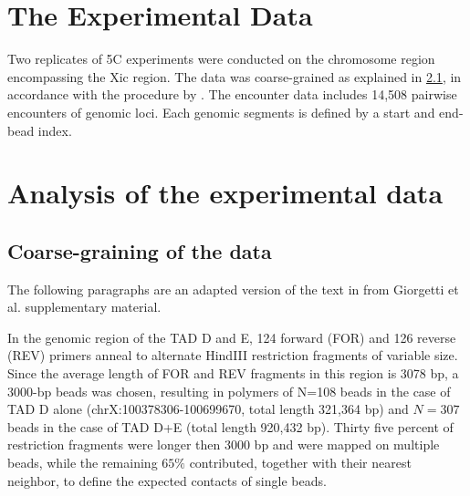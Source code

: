 \documentclass[12pt]{book}
\begin{document}
\section{The Experimental Data}\label{section_theExperimentalData}
Two replicates of 5C experiments were conducted on the chromosome region encompassing the Xic region. The data was coarse-grained as explained in \ref{subsection_coarseGrainingOfEncounterData}, in accordance with the procedure by \cite{giorgetti2014predictive}\cite{nora2012spatial}.
The encounter data includes 14,508 pairwise encounters of genomic loci. Each genomic segments is defined by a start and end-bead index.

\section{Analysis of the experimental data}\label{section_AnalysisOfTheExperimentalData}


\subsection{Coarse-graining of the data}\label{subsection_coarseGrainingOfEncounterData}
The following paragraphs are an adapted version of the text in from Giorgetti et al. \cite{giorgetti2014predictive} supplementary material.

In the genomic region of the TAD D and E, 124 forward (FOR) and 126 reverse (REV) primers anneal to alternate HindIII restriction fragments of variable size. 
Since the average length of FOR and REV fragments in this region is 3078 bp, a 3000-bp beads was chosen, resulting in polymers of N=108 beads in the case of TAD D alone (chrX:100378306-100699670, total length 321,364 bp) and $N=307$ beads in the case of TAD D+E (total length 920,432 bp). Thirty five percent of restriction fragments were longer then 3000 bp and were mapped on multiple beads, while the remaining $65\%$ contributed, together with their nearest neighbor, to define the expected contacts of single beads.
\end{document}
